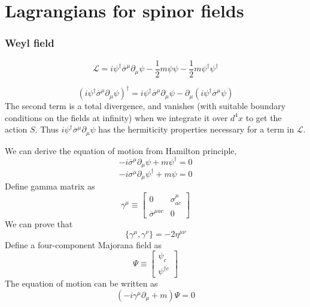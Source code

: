 \documentclass[cyan]{elegantnote}
\begin{document}
\section{Lagrangians for spinor fields}
\subsubsection{Weyl field}
\[\mathcal{L} = i \psi^{\dagger} \overline{\sigma}^{\mu} \partial_{\mu} \psi - \frac{1}{2}m \psi \psi - \frac{1}{2}m \psi^{\dagger} \psi^{\dagger}\]
\begin{note}
\[(i \psi^{\dagger} \overline{\sigma}^{\mu} \partial_{\mu} \psi)^{\dagger} = i \psi^{\dagger} \overline{\sigma}^{\mu} \partial_{\mu} \psi - \partial_{\mu}(i \psi^{\dagger} \overline{\sigma}^{\mu} \psi)\]
The second term is a total divergence, and vanishes (with suitable boundary conditions on the fields at infinity) when we integrate it over $d^4 x$ to get the action $S$. Thus $i \psi^{\dagger} \overline{\sigma}^{\mu} \partial_{\mu} \psi$  has the hermiticity properties necessary for a term in $\mathcal{L}$.
\end{note}
\noindent
We can derive the equation of motion from Hamilton principle,
\[-i\overline{\sigma}^{\mu} \partial_{\mu} \psi + m \psi^{\dagger} = 0\]
\[-i\sigma^{\mu} \partial_{\mu} \psi^{\dagger} + m \psi = 0\]
Define gamma matrix as
\[\gamma^{\mu} \equiv \left[ \begin{matrix} 0& \sigma^{\mu}_{a\dot{c}}\\ \overline{\sigma}^{\mu\dot{a}c}& 0\end{matrix} \right] \]
We can prove that
\[\{\gamma^{\mu},\gamma^{\nu}\} = -2\eta^{\mu\nu}\]
Define a four-component Majorana field as
\[\Psi \equiv \left[ \begin{matrix} \psi_c \\ \psi^{\dagger \dot{c}}\end{matrix} \right] \]
The equation of motion can be written as
\[(-i\gamma^{\mu}\partial_{\mu}+m)\Psi=0\]
\end{document}

